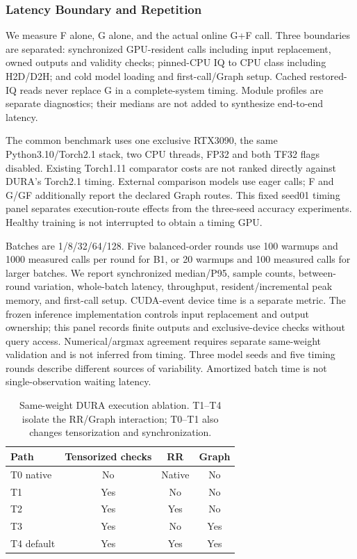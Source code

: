 \subsubsection{Latency Boundary and Repetition}
We measure F alone, G alone, and the actual online G+F call. Three boundaries are separated: synchronized GPU-resident calls including input replacement, owned outputs and validity checks; pinned-CPU IQ to CPU class including H2D/D2H; and cold model loading and first-call/Graph setup. Cached restored-IQ reads never replace G in a complete-system timing. Module profiles are separate diagnostics; their medians are not added to synthesize end-to-end latency.

The common benchmark uses one exclusive RTX3090, the same Python3.10/Torch2.1 stack, two CPU threads, FP32 and both TF32 flags disabled. Existing Torch1.11 comparator costs are not ranked directly against DURA's Torch2.1 timing. External comparison models use eager calls; F and G/GF additionally report the declared Graph routes. This fixed seed01 timing panel separates execution-route effects from the three-seed accuracy experiments. Healthy training is not interrupted to obtain a timing GPU.

Batches are 1/8/32/64/128. Five balanced-order rounds use 100 warmups and 1000 measured calls per round for B1, or 20 warmups and 100 measured calls for larger batches. We report synchronized median/P95, sample counts, between-round variation, whole-batch latency, throughput, resident/incremental peak memory, and first-call setup. CUDA-event device time is a separate metric. The frozen inference implementation controls input replacement and output ownership; this panel records finite outputs and exclusive-device checks without query access. Numerical/argmax agreement requires separate same-weight validation and is not inferred from timing. Three model seeds and five timing rounds describe different sources of variability. Amortized batch time is not single-observation waiting latency.

\begin{table}[t]
\centering\footnotesize
\caption{Same-weight DURA execution ablation. T1--T4 isolate the RR/Graph interaction; T0--T1 also changes tensorization and synchronization.}
\label{tab:dura-execution}
\begin{tabular}{lccc}
\toprule
Path & Tensorized checks & RR & Graph\\
\midrule
T0 native & No & Native & No\\
T1 & Yes & No & No\\
T2 & Yes & Yes & No\\
T3 & Yes & No & Yes\\
T4 default & Yes & Yes & Yes\\
\bottomrule
\end{tabular}
\end{table}

